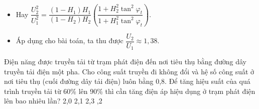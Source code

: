 \begin{vidu}
{\begin{itemize}
				\item Hay $\dfrac{U_2^2}{U_1^2}=\dfrac{\left(1-H_1\right)H_1}{\left(1-H_2\right)H_2}\left(\dfrac{1+H_2^2{\tan}^2\varphi_t}{1+H_1^2{\tan}^2\varphi_t}\right)$.
				\item Áp dụng cho bài toán, ta thu được $\dfrac{U_2}{U_1}\approx 1,38$.
			\end{itemize}
	}
\end{vidu}
\begin{vidu}%
	Điện năng được truyền tải từ trạm phát điện đến nơi tiêu thụ bằng đường dây truyền tải điện một pha. Cho công suất truyền đi không đổi và hệ số công suất ở nơi tiêu thụ (cuối đường dây tải điện) luôn bằng 0,8. Để tăng hiệu suất của quá trình truyền tải từ 60\% lên 90\% thì cần tăng điện áp hiệu dụng ở trạm phát điện lên bao nhiêu lần?
	\choice
	{2,0}
	{2,1}
	{2,3}
	{,2}
	\end{vidu}